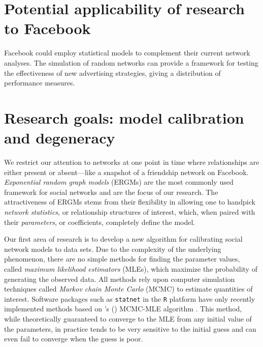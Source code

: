 \documentclass[12pt]{article}
\begin{document}
\section{Potential applicability of research to Facebook}
Facebook could employ statistical models to complement their current network analyses.  The simulation of random networks can provide a framework for testing the effectiveness of new advertising strategies, giving a distribution of performance measures.  

\section{Research goals: model calibration and degeneracy}
We restrict our attention to networks at one point in time where relationships are either present or absent---like a snapshot of a friendship network on Facebook.  \textit{Exponential random graph models} (ERGMs) are the most commonly used framework for social networks and are the focus of our research.  The attractiveness of ERGMs stems from their flexibility in allowing one to handpick \textit{network statistics}, or relationship structures of interest, which, when paired with their \textit{parameters}, or coefficients, completely define the model.

Our first area of research is to develop a new algorithm for calibrating social network models to data sets.  Due to the complexity of the underlying phenomenon, there are no simple methods for finding the parameter values, called \textit{maximum likelihood estimators} (MLEs), which maximize the probability of generating the observed data.  All methods rely upon computer simulation techniques called \textit{Markov chain Monte Carlo} (MCMC) to estimate quantities of interest.  Software packages such as \texttt{statnet} in the \texttt{R} platform have only recently implemented methods based on \citeauthor{Geyer:1992}'s (\citeyear{Geyer:1992}) MCMC-MLE algorithm \citep{statnet:R}.  This method, while theoretically guaranteed to converge to the MLE from any initial value of the parameters, in practice tends to be very sensitive to the initial guess and can even fail to converge when the guess is poor.
\end{document}
